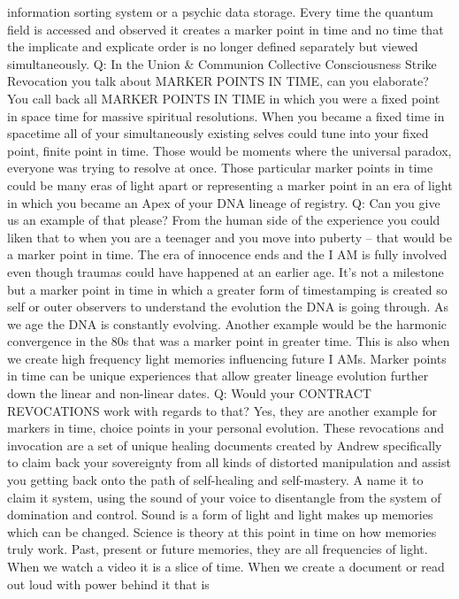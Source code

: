 information sorting system or a psychic data storage. Every time the
quantum field is accessed and observed it creates a marker point in time
and no time that the implicate and explicate order is no longer defined
separately but viewed simultaneously. Q: In the Union \& Communion
Collective Consciousness Strike Revocation you talk about MARKER POINTS
IN TIME, can you elaborate? You call back all MARKER POINTS IN TIME in
which you were a fixed point in space time for massive spiritual
resolutions. When you became a fixed time in spacetime all of your
simultaneously existing selves could tune into your fixed point, finite
point in time. Those would be moments where the universal paradox,
everyone was trying to resolve at once. Those particular marker points
in time could be many eras of light apart or representing a marker point
in an era of light in which you became an Apex of your DNA lineage of
registry. Q: Can you give us an example of that please? From the human
side of the experience you could liken that to when you are a teenager
and you move into puberty -- that would be a marker point in time. The
era of innocence ends and the I AM is fully involved even though traumas
could have happened at an earlier age. It's not a milestone but a marker
point in time in which a greater form of timestamping is created so self
or outer observers to understand the evolution the DNA is going through.
As we age the DNA is constantly evolving. Another example would be the
harmonic convergence in the 80s that was a marker point in greater time.
This is also when we create high frequency light memories influencing
future I AMs. Marker points in time can be unique experiences that allow
greater lineage evolution further down the linear and non-linear dates.
Q: Would your CONTRACT REVOCATIONS work with regards to that? Yes, they
are another example for markers in time, choice points in your personal
evolution. These revocations and invocation are a set of unique healing
documents created by Andrew specifically to claim back your sovereignty
from all kinds of distorted manipulation and assist you getting back
onto the path of self-healing and self-mastery. A name it to claim it
system, using the sound of your voice to disentangle from the system of
domination and control. Sound is a form of light and light makes up
memories which can be changed. Science is theory at this point in time
on how memories truly work. Past, present or future memories, they are
all frequencies of light. When we watch a video it is a slice of time.
When we create a document or read out loud with power behind it that is

